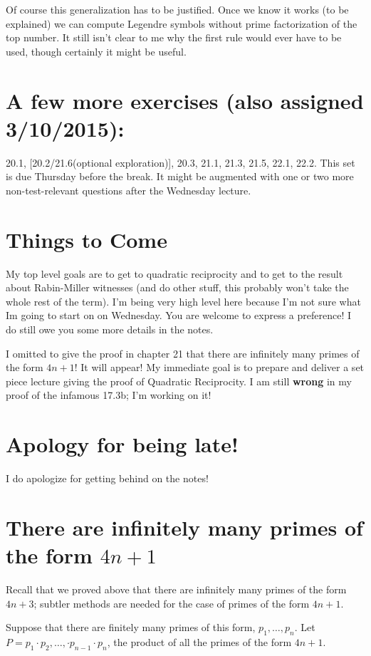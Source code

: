 \documentclass[12pt]{article}
\begin{document}
Of course this generalization has to be justified.   Once we know it works (to be explained) we can compute Legendre symbols without prime factorization of the top number.  It still isn't clear to me why the first rule would ever
have to be used, though certainly it might be useful.  

\section{A few more exercises (also assigned 3/10/2015):}

20.1, [20.2/21.6(optional exploration)],  20.3, 21.1, 21.3, 21.5, 22.1, 22.2.   This set is due Thursday before the break.  It might be augmented with one or two more non-test-relevant questions after the Wednesday lecture.

\section{Things to Come}
My top level goals are to get to quadratic reciprocity and to get to the result about Rabin-Miller witnesses (and do other stuff, this probably won't take the whole rest of the term).  I'm being very high level here because I'm not sure what Im going to start on on Wednesday.   You are welcome to express a preference!   I do still owe you some more details in the notes.

I omitted to give the proof in chapter 21 that there are infinitely many primes of the form $4n+1$!  It will appear!   My immediate goal is to prepare and deliver a set piece lecture giving the proof of Quadratic Reciprocity.  I am still {\bf wrong}
in my proof of the infamous 17.3b; I'm working on it!

\section {Apology for being late!}

I do apologize for getting behind on the notes!

\section{There are infinitely many primes of the form $4n+1$}

Recall that we proved above that there are infinitely many primes of the form $4n+3$;  subtler methods are needed for the case of primes of the form $4n+1$.

Suppose that there are finitely many primes of this form, $p_1,\ldots,p_n$.   Let $P=p_1\cdot p_2 ,\ldots,\cdot p_{n-1}\cdot p_n$, the product of all the primes of the form $4n+1$.
\end{document}
